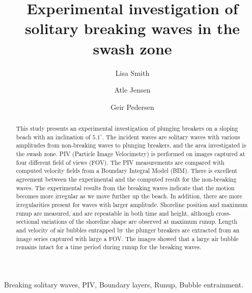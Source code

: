 \documentclass[review, authoryear]{elsarticle}
\begin{document}
\begin{frontmatter}
\title{Experimental investigation of solitary breaking waves in the swash zone}
\author[1]{Lisa Smith}	
\author[1]{Atle Jensen}
\author[1]{Geir Pedersen}

\address[1]{ Department of Mathematics, University of Oslo, Norway}



\setlength{\marginparwidth}{1.1cm}

\begin{abstract}
This study presents an experimental investigation of plunging breakers on a sloping beach with an inclination of $5.1^{\circ}$. The incident waves are solitary waves with various amplitudes from non-breaking waves to plunging breakers, and the area investigated is the swash zone. PIV (Particle Image Velocimetry) is performed on images captured at four different field of views (FOV). The PIV measurements are compared with computed velocity fields from a Boundary Integral Model (BIM). 
There is excellent agreement between the experimental and the computed result for the non-breaking waves. The experimental results from the breaking waves indicate that the motion becomes more irregular as we move further up the beach. In addition, there are more irregularities present  for waves with larger amplitude. Shoreline position and maximum runup are measured, and are repeatable in both time and height, although  cross-sectional variations of the shoreline shape are observed at maximum runup.  Length and velocity of air bubbles entrapped by the plunger breakers are extracted from an image series captured with large a FOV. The images showed that a large air bubble remains intact for a time period during runup for the breaking waves. \\
\end{abstract}


\begin{keyword}
Breaking solitary waves, PIV, Boundary layers, Runup, Bubble entrainment.
\end{keyword}

\end{frontmatter}

\linenumbers
\end{document}
